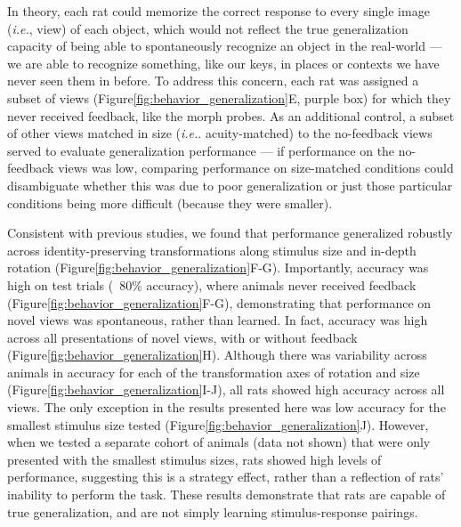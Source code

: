In theory, each rat could memorize the correct response to every single image (\textit{i.e.}, view) of each object, which would not reflect the true generalization capacity of being able to spontaneously recognize an object in the real-world --- we are able to recognize something, like our keys, in places or contexts we have never seen them in before. To address this concern, each rat was assigned a subset of views (Figure\ref{fig:behavior_generalization}E, purple box) for which they never received feedback, like the morph probes. As an additional control, a subset of other views matched in size (\textit{i.e.}. acuity-matched) to the no-feedback views served to evaluate generalization performance --- if performance on the no-feedback views was low, comparing performance on size-matched conditions could disambiguate whether this was due to poor generalization or just those particular conditions being more difficult (because they were smaller).


Consistent with previous studies\cite{Zoccolan2009}, we found that performance generalized robustly across identity-preserving transformations along stimulus size and in-depth rotation (Figure\ref{fig:behavior_generalization}F-G). Importantly, accuracy was high on test trials (~80\% accuracy), where animals never received feedback (Figure\ref{fig:behavior_generalization}F-G), demonstrating that performance on novel views was spontaneous, rather than learned. In fact, accuracy was high across all presentations of novel views, with or without feedback (Figure\ref{fig:behavior_generalization}H). Although there was variability across animals in accuracy for each of the transformation axes of rotation and size (Figure\ref{fig:behavior_generalization}I-J), all rats showed high accuracy across all views. The only exception in the results presented here was low accuracy for the smallest stimulus size tested (Figure\ref{fig:behavior_generalization}J). However, when we tested a separate cohort of animals (data not shown) that were only presented with the smallest stimulus sizes, rats showed high levels of performance, suggesting this is a strategy effect, rather than a reflection of rats' inability to perform the task. These results demonstrate that rats are capable of true generalization, and are not simply learning stimulus-response pairings. 


